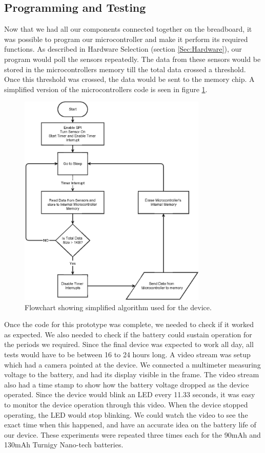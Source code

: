\subsection{Programming and Testing}
\label{Sec:Programming}
Now that we had all our components connected together on the breadboard,
it was possible to program our microcontroller and make it perform its required functions.
As described in Hardware Selection (section \ref{Sec:Hardware}),
our program would poll the sensors repeatedly.
The data from these sensors would be stored in the microcontrollers memory till the total data crossed a threshold.
Once this threshold was crossed, the data would be sent to the memory chip.
A simplified version of the microcontrollers code is seen in figure \ref{Fig:MainAlgo}.
\begin{figure}
\begin{center}
\includegraphics[width=0.8\textwidth]{images/MainAlgo.eps}
\caption{Flowchart showing simplified algorithm used for the device.}
\label{Fig:MainAlgo}
\end{center}
\end{figure}
Once the code for this prototype was complete, we needed to check if it worked as expected.
We also needed to check if the battery could sustain operation for the periods we required.
Since the final device was expected to work all day,
all tests would have to be between 16 to 24 hours long.
A video stream was setup which had a camera pointed at the device.
We connected a multimeter measuring voltage to the battery,
and had its display visible in the frame.
The video stream also had a time stamp to show how the battery voltage dropped as the device operated.
Since the device would blink an LED every 11.33 seconds,
it was easy to monitor the device operation through this video.
When the device stopped operating,
the LED would stop blinking.
We could watch the video to see the exact time when this happened,
and have an accurate idea on the battery life of our device.
These experiments were repeated three times each for the 90mAh and 130mAh Turnigy Nano-tech batteries.

